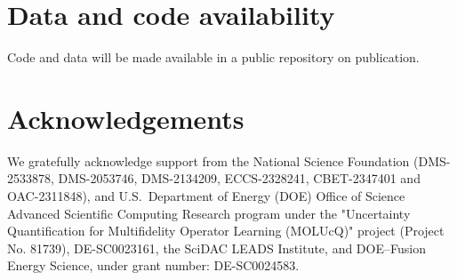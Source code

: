 \documentclass[preprint,11pt]{elsarticle}
\theoremstyle{definition}
\begin{document}
\section*{Data and code availability}
Code and data will be made available in a public repository on publication.

\section*{Acknowledgements}
We gratefully acknowledge support from the National Science Foundation (DMS-2533878, DMS-2053746, DMS-2134209, ECCS-2328241, CBET-2347401 and OAC-2311848), and U.S.~Department of Energy (DOE) Office of Science Advanced Scientific Computing Research program under the "Uncertainty Quantification for Multifidelity Operator Learning (MOLUcQ)" project (Project No. 81739), DE-SC0023161, the SciDAC LEADS Institute, and DOE–Fusion Energy Science, under grant number: DE-SC0024583.

\appendix
\renewcommand{\thesubsection}{\Alph{section}.\arabic{subsection}}
\renewcommand{\thetheorem}{\Alph{section}.\arabic{theorem}}




{\footnotesize}
\end{document}
